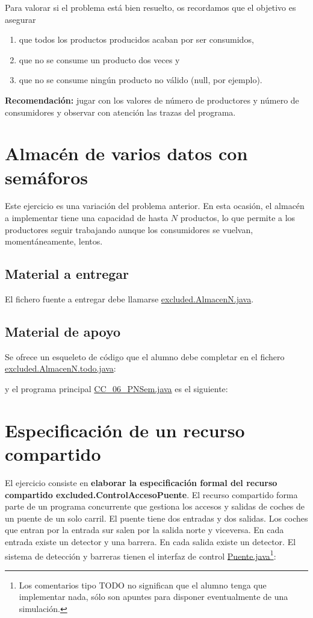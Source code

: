 \documentclass{article}
\begin{document}
Para valorar si el problema está bien resuelto, os recordamos que el
objetivo es asegurar
\begin{enumerate}
\item que todos los productos producidos acaban por ser consumidos,
\item que no se consume un producto dos veces y
\item que no se consume ningún producto no válido (null, por ejemplo).
\end{enumerate}

\noindent\textbf{Recomendación:} jugar con los valores de número de
productores y número de consumidores y observar con atención las
trazas del programa.

\clearpage
\section{Almacén de varios datos con semáforos}
Este ejercicio es una variación del problema anterior. En esta
ocasión, el almacén a implementar tiene una capacidad de hasta $N$
productos, lo que permite a los productores seguir trabajando aunque
los consumidores se vuelvan, momentáneamente, lentos.

\subsection*{Material a entregar}
El fichero fuente a entregar debe llamarse \url{excluded.AlmacenN.java}.

\subsection*{Material de apoyo}
Se ofrece un esqueleto de código que el alumno debe completar en el fichero
\url{excluded.AlmacenN.todo.java}:


y el programa principal \url{CC_06_PNSem.java} es el siguiente:


\clearpage
\section{Especificación de un recurso compartido}
El ejercicio consiste en \textbf{elaborar la especificación formal del
  recurso compartido excluded.ControlAccesoPuente}. El recurso compartido forma
parte de un programa concurrente que gestiona los accesos y salidas de
coches de un puente de un solo carril. El puente tiene dos entradas y
dos salidas.  Los coches que entran por la entrada sur salen por la
salida norte y viceversa. En cada entrada existe un detector y una
barrera. En cada salida existe un detector. El sistema de detección y
barreras tienen el interfaz de control \url{Puente.java}\footnote{Los
  comentarios tipo TODO no significan que el alumno tenga que
  implementar nada, sólo son apuntes para disponer eventualmente de
  una simulación.}:

\end{document}
